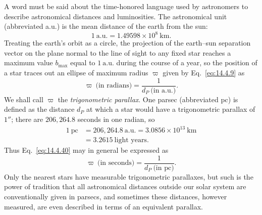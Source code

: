 A word must be said about the time-honored language used by astronomers to
describe astronomical distances and luminosities. The astronomical unit
(abbreviated a.u.) is the mean distance of the earth from the sun:
\begin{equation}
  1\ \mathrm{a.u.}
  =
  1.49598\times10^8\ \mathrm{km}.
  \tag{14.4.39}\label{eq:14.4.39}
\end{equation}
Treating the earth's orbit as a circle, the projection of the earth--sun
separation vector on the plane normal to the line of sight to any fixed star
reaches a maximum value \(b_{\max}\) equal to \(1\ \mathrm{a.u.}\) during
the course of a year, so the position of a star traces out an ellipse of
maximum radius \(\varpi\) given by Eq.~\eqref{eq:14.4.9} as
\begin{equation}
  \varpi\ \text{(in radians)}
  =
  \frac{1}{d_P\ \text{(in a.u.)}}.
  \tag{14.4.40}\label{eq:14.4.40}
\end{equation}
We shall call \(\varpi\) the \emph{trigonometric parallax}. One parsec
(abbreviated pc) is defined as the distance \(d_P\) at which a star would
have a trigonometric parallax of \(1''\); there are \(206{,}264.8\) seconds
in one radian, so
\begin{equation}
  \begin{aligned}
  1\ \mathrm{pc}
  &=
  206{,}264.8\ \mathrm{a.u.}
  =
  3.0856\times10^{13}\ \mathrm{km}
  \\
  &=
  3.2615\ \text{light years}.
  \end{aligned}
  \tag{14.4.41}\label{eq:14.4.41}
\end{equation}
Thus Eq.~\eqref{eq:14.4.40} may in general be expressed as
\begin{equation}
  \varpi\ \text{(in seconds)}
  =
  \frac{1}{d_P\ \text{(in pc)}}.
  \tag{14.4.42}\label{eq:14.4.42}
\end{equation}
Only the nearest stars have measurable trigonometric parallaxes, but such is
the power of tradition that all astronomical distances outside our solar
system are conventionally given in parsecs, and sometimes these distances,
however measured, are even described in terms of an equivalent parallax.

